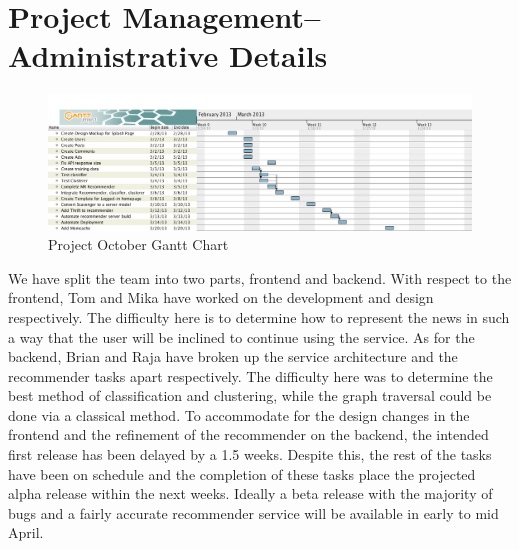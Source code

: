 \documentclass[11pt,letterpaper]{article}
\begin{document}
\section{Project Management--Administrative Details}

\begin{figure}
\centering
\includegraphics[scale=0.35]{img/octoborg-gantt.png}
\caption{Project October Gantt Chart}
\label{fig:gantt}
\end{figure}

We have split the team into two parts, frontend and backend. With respect to the frontend, Tom and Mika have worked on the development and design respectively.
The difficulty here is to determine how to represent the news in such a way that the user will be inclined to continue using the service.
As for the backend, Brian and Raja have broken up the service architecture and the recommender tasks apart respectively.
The difficulty here was to determine the best method of classification and clustering, while the graph traversal could be done via a classical method.
To accommodate for the design changes in the frontend and the refinement of the recommender on the backend, the intended first release has been delayed by a 1.5 weeks.
Despite this, the rest of the tasks have been on schedule and the completion of these tasks place the projected alpha release within the next weeks.
Ideally a beta release with the majority of bugs and a fairly accurate recommender service will be available in early to mid April.
\end{document}
